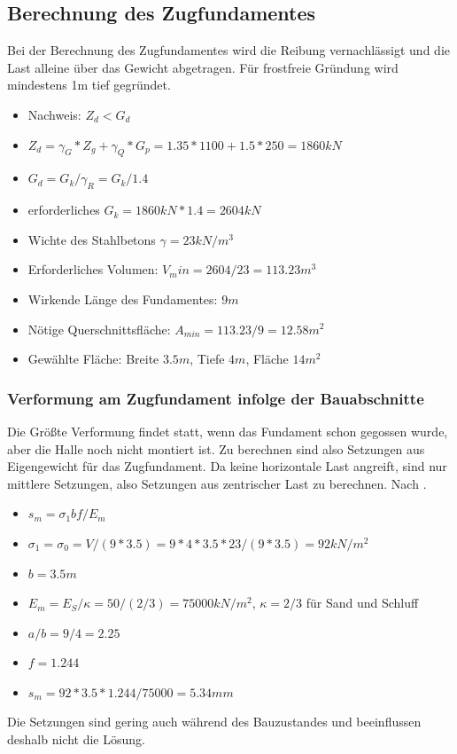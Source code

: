 \documentclass[11pt,fleqn,a4paper,halfparskip]{article}
\begin{document}
\subsection{Berechnung des Zugfundamentes}
Bei der Berechnung des Zugfundamentes wird die Reibung vernachlässigt und die Last alleine über das Gewicht abgetragen. Für frostfreie Gründung wird mindestens 1m tief gegründet.
\begin{itemize}
\item[] Nachweis: $Z_d <  G_d$
\item[] $Z_d = \gamma_G*Z_g + \gamma_Q*G_p = 1.35*1100 + 1.5*250 = 1860kN$
\item[] $G_d = G_k/\gamma_R = G_k/1.4$
\item[] erforderliches $G_k = 1860kN*1.4 = 2604kN$
\item[] Wichte des Stahlbetons $\gamma = 23kN/m^3$
\item[] Erforderliches Volumen: $V_min = 2604/23 = 113.23m^3$
\item[] Wirkende Länge des Fundamentes: $9m$
\item[] Nötige Querschnittsfläche: $A_{min} = 113.23/9 = 12.58m^2$
\item[] Gewählte Fläche: Breite $3.5m$, Tiefe $4m$, Fläche $14m^2$
\end{itemize}
\subsubsection{Verformung am Zugfundament infolge der Bauabschnitte}
Die Größte Verformung findet statt, wenn das Fundament schon gegossen wurde, aber die Halle noch nicht montiert ist. Zu berechnen sind also Setzungen aus Eigengewicht für das Zugfundament. Da keine horizontale Last angreift, sind nur mittlere Setzungen, also Setzungen aus zentrischer Last zu berechnen. Nach \cite[S.68]{wsp}.
\begin{itemize}
\item[] $s_m = \sigma_1bf/E_m$
\item[] $\sigma_1 = \sigma_0 = V/(9*3.5) = 9*4*3.5*23/(9*3.5) = 92kN/m^2$
\item[] $b = 3.5m$
\item[] $E_m = E_S/\kappa = 50/(2/3) = 75000kN/m^2$, $\kappa = 2/3$ für Sand und Schluff
\item[] $a/b = 9/4 = 2.25$
\item[] $f = 1.244$
\item[] $s_m = 92*3.5*1.244/75000 = 5.34mm$
\end{itemize}
Die Setzungen sind gering auch während des Bauzustandes \cite[S.37]{wsp} und beeinflussen deshalb nicht die Lösung.
\end{document}
